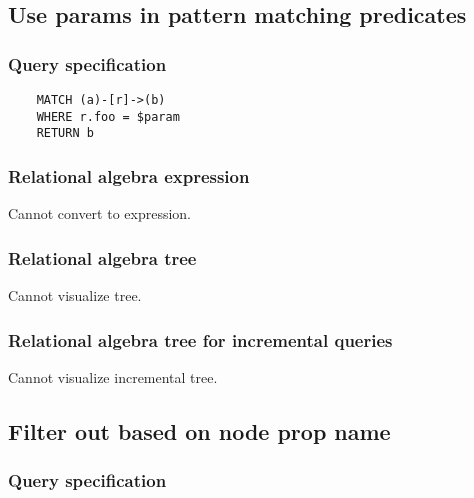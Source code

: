 	\subsection{Use params in pattern matching predicates}

	\subsubsection*{Query specification}

	\begin{lstlisting}
	MATCH (a)-[r]->(b)
	WHERE r.foo = $param
	RETURN b
	\end{lstlisting}


	\subsubsection*{Relational algebra expression}

	Cannot convert to expression.

	\subsubsection*{Relational algebra tree}

	Cannot visualize tree.

	\subsubsection*{Relational algebra tree for incremental queries}

	Cannot visualize incremental tree.
	\subsection{Filter out based on node prop name}

	\subsubsection*{Query specification}

